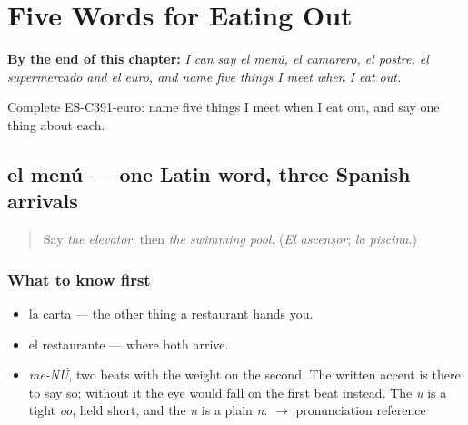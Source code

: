 
\chapter{Five Words for Eating Out}
\label{ch:el-menu-y-el-camarero}

\begin{chapteropening}
\textbf{By the end of this chapter:} \emph{I can say el menú, el camarero, el postre, el supermercado and el euro, and name five things I meet when I eat out.}

Complete ES-C391-euro: name five things I meet when I eat out, and say one thing about each.
\end{chapteropening}

\section[el menú]{el menú — one Latin word, three Spanish arrivals}

\label{lesson:ES-C391-menu}



\begin{quote}
Say \emph{the elevator}, then \emph{the swimming pool}. (\emph{El ascensor}; \emph{la piscina}.)
\end{quote}

\subsection*{What to know first}
\begin{itemize}
\raggedright
  \item la carta — the other thing a restaurant hands you.
  \item el restaurante — where both arrive.
\end{itemize}

\begin{sounds}
\begin{itemize}
\raggedright
  \item \emph{me-NÚ}, two beats with the weight on the second. The written accent is there to say so; without it the eye would fall on the first beat instead. The \emph{u} is a tight \emph{oo}, held short, and the \emph{n} is a plain \emph{n}. $\to$ pronunciation reference
\end{itemize}
\end{sounds}

